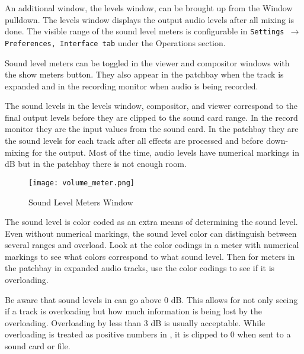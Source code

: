 An additional window, the levels window, can be brought up from the Window pulldown.  
The levels window displays the output audio levels after all mixing is done.  
The visible range of the sound level meters is configurable in \texttt{Settings $\rightarrow$ Preferences, Interface tab} under the Operations section.

Sound level meters can be toggled in the viewer and compositor windows with the show meters button.  
They also appear in the patchbay when the track is expanded and in the recording monitor when audio is being recorded. 

The sound levels in the levels window, compositor, and viewer correspond to the final output levels before they are clipped to the sound card range.  
In the record monitor they are the input values from the sound card.  
In the patchbay they are the sound levels for each track after all effects are processed and before down-mixing for the output.  
Most of the time, audio levels have numerical markings in dB but in the patchbay there is not enough room.

\begin{wrapfigure}[15]{O}{0.3\linewidth} 
	\centering
	\vspace{-4ex}
	\texttt{[image: volume\_meter.png]}
	\caption{Sound Level Meters Window}
	\label{fig:volume_meter}
\end{wrapfigure}

The sound level is color coded as an extra means of determining the sound level.  
Even without numerical markings, the sound level color can distinguish between several ranges and overload.  
Look at the color codings in a meter with numerical markings to see what colors correspond to what sound level.  
Then for meters in the patchbay in expanded audio tracks, use the color codings to see if it is overloading.

Be aware that sound levels in \CGG{} can go above 0 dB.  
This allows for not only seeing if a track is overloading but how much information is being lost by the overloading.  
Overloading by less than 3 dB is usually acceptable.  
While overloading is treated as positive numbers in \CGG{}, it is clipped to 0 when sent to a sound card or file.








